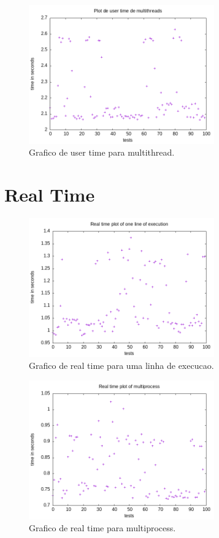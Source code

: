 \documentclass[12pt]{article}
\begin{document}
    \begin{figure}[H]
        \caption{Grafico de user time para multithread.}
        \centering
        \includegraphics[width=8cm]{doc/user_threads.png}
    \end{figure}


\section{Real Time}\label{results}
    \begin{figure}[H]
        \caption{Grafico de real time para uma linha de execucao.}
        \centering
        \includegraphics[width=8cm]{doc/real_simples.png}
    \end{figure}

    \begin{figure}[H]
        \caption{Grafico de real time para multiprocess.}
        \centering
        \includegraphics[width=8cm]{doc/real_processos.png}
    \end{figure}
\end{document}
